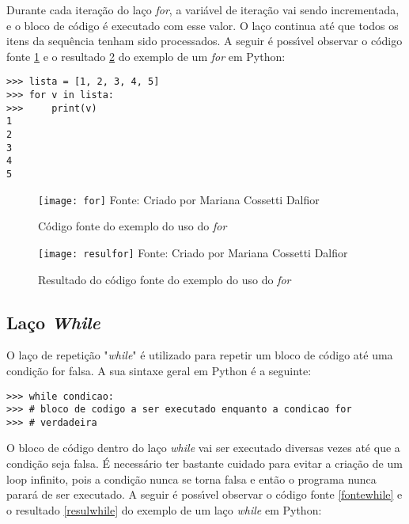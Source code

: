 Durante cada itera\c{c}\~{a}o do la\c{c}o \textsl{for}, a vari\'{a}vel de itera\c{c}\~{a}o vai sendo incrementada, e o bloco de c\'{o}digo \'{e} executado com esse valor. O la\c{c}o continua at\'{e} que todos os itens da sequ\^{e}ncia tenham sido processados. A seguir \'{e} poss\'{\i}vel observar o c\'{o}digo fonte \ref{fontefor} e o resultado \ref{resulfor} do exemplo de um \textsl{for} em Python:

\begin{lstlisting}
>>> lista = [1, 2, 3, 4, 5]
>>> for v in lista:
>>> 	print(v)
1
2 
3
4
5
\end{lstlisting}	

\begin{figure}[H]
	\begin{center}
		\caption{C\'{o}digo fonte do exemplo do uso do \textsl{for}} \label{fontefor}
		\texttt{[image: for]} 
		\newline
		Fonte: Criado por Mariana Cossetti Dalfior
	\end{center}
\end{figure}

\begin{figure}[H]
	\begin{center}
		\caption{Resultado do c\'{o}digo fonte do exemplo do uso do \textsl{for}} \label{resulfor}
		\texttt{[image: resulfor]} 
		\newline
		Fonte: Criado por Mariana Cossetti Dalfior
	\end{center}
\end{figure}

            \subsection{La\c{c}o \textsl{While}}
O la\c{c}o de repeti\c{c}\~{a}o "\textsl{while}" \'{e} utilizado para repetir um bloco de c\'{o}digo at\'{e} uma condi\c{c}\~{a}o for falsa. A sua sintaxe geral em Python \'{e} a seguinte:

\begin{lstlisting}
>>> while condicao:
>>> # bloco de codigo a ser executado enquanto a condicao for 
>>> # verdadeira
\end{lstlisting}	

O bloco de c\'{o}digo dentro do la\c{c}o \textsl{while} vai ser executado diversas vezes at\'{e} que a condi\c{c}\~{a}o seja falsa. \'{E} necess\'{a}rio ter bastante cuidado para evitar a cria\c{c}\~{a}o de um loop infinito, pois a condi\c{c}\~{a}o nunca se torna falsa e ent\~{a}o o programa nunca parar\'{a} de ser executado. A seguir \'{e} poss\'{\i}vel observar o c\'{o}digo fonte \ref{fontewhile} e o resultado \ref{resulwhile} do exemplo de um laço \textsl{while} em Python:

